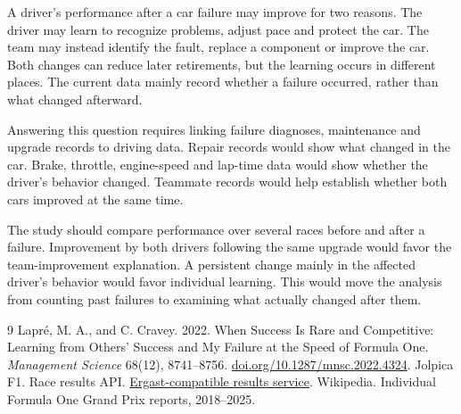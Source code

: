 \documentclass[11pt,letterpaper]{article}
\begin{document}
A driver's performance after a car failure may improve for two reasons. The driver may learn to recognize problems, adjust pace and protect the car. The team may instead identify the fault, replace a component or improve the car. Both changes can reduce later retirements, but the learning occurs in different places. The current data mainly record whether a failure occurred, rather than what changed afterward.

Answering this question requires linking failure diagnoses, maintenance and upgrade records to driving data. Repair records would show what changed in the car. Brake, throttle, engine-speed and lap-time data would show whether the driver's behavior changed. Teammate records would help establish whether both cars improved at the same time.

The study should compare performance over several races before and after a failure. Improvement by both drivers following the same upgrade would favor the team-improvement explanation. A persistent change mainly in the affected driver's behavior would favor individual learning. This would move the analysis from counting past failures to examining what actually changed after them.

\begin{thebibliography}{9}
\setlength{\itemsep}{2pt}
Lapr\'{e}, M. A., and C. Cravey. 2022.
When Success Is Rare and Competitive: Learning from Others' Success and My Failure at the Speed of Formula One.
\emph{Management Science} 68(12), 8741--8756.
\href{https://doi.org/10.1287/mnsc.2022.4324}{doi.org/10.1287/mnsc.2022.4324}.
Jolpica F1. Race results API.
\href{https://api.jolpi.ca/ergast/f1/}{Ergast-compatible results service}.
Wikipedia. Individual Formula One Grand Prix reports, 2018--2025.
\end{thebibliography}
\end{document}
